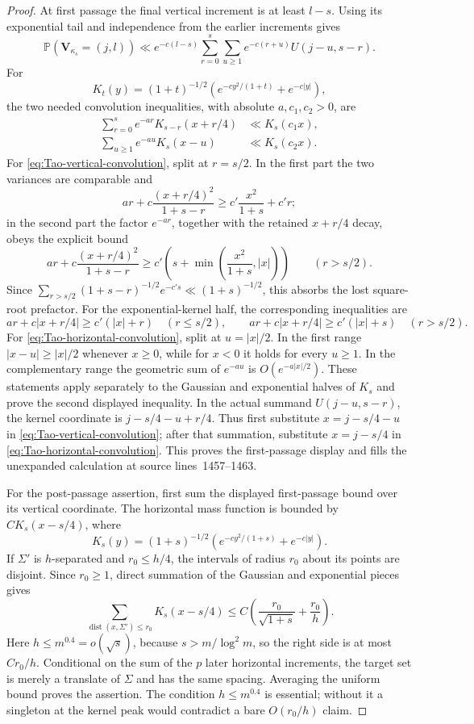 \begin{proof}
At first passage the final vertical increment is at least \(l-s\).  Using
its exponential tail and independence from the earlier increments gives
\[
 \mathbb P(\mathbf V_{\kappa_s}=(j,l))
 \ll e^{-c(l-s)}\sum_{r=0}^s\sum_{u\ge1}
 e^{-c(r+u)}U(j-u,s-r).
\]
For
\[
 K_t(y)=(1+t)^{-1/2}
 \left(e^{-c y^2/(1+t)}+e^{-c|y|}\right),
\]
the two needed convolution inequalities, with absolute
\(a,c_1,c_2>0\), are
\begin{align}
 \sum_{r=0}^{s}e^{-ar}K_{s-r}(x+r/4)
 &\ll K_s(c_1x),\label{eq:Tao-vertical-convolution}\\
 \sum_{u\ge1}e^{-au}K_s(x-u)
 &\ll K_s(c_2x).\label{eq:Tao-horizontal-convolution}
\end{align}
For \eqref{eq:Tao-vertical-convolution}, split at \(r=s/2\).  In the first
part the two variances are comparable and
\[
 ar+c\frac{(x+r/4)^2}{1+s-r}
 \ge c'\frac{x^2}{1+s}+c'r;
\]
in the second part the factor \(e^{-ar}\), together with the retained
\(x+r/4\) decay, obeys the explicit bound
\[
 ar+c\frac{(x+r/4)^2}{1+s-r}
 \ge c'\left(s+\min\left(\frac{x^2}{1+s},|x|\right)\right)
 \qquad(r>s/2).
\]
Since
\(\sum_{r>s/2}(1+s-r)^{-1/2}e^{-c's}\ll
(1+s)^{-1/2}\), this absorbs the lost square-root prefactor.  For the
exponential-kernel half, the corresponding inequalities are
\[
 ar+c|x+r/4|\ge c'(|x|+r)\quad(r\le s/2),
 \qquad
 ar+c|x+r/4|\ge c'(|x|+s)\quad(r>s/2).
\]
For \eqref{eq:Tao-horizontal-convolution}, split at \(u=|x|/2\).  In the
first range \(|x-u|\ge|x|/2\) whenever \(x\ge0\), while for \(x<0\) it
holds for every \(u\ge1\).  In the complementary range the geometric sum
of \(e^{-au}\) is \(O(e^{-a|x|/2})\).  These statements apply separately
to the Gaussian and exponential halves of \(K_s\) and prove the second
displayed inequality.  In the actual summand \(U(j-u,s-r)\), the kernel
coordinate is \(j-s/4-u+r/4\).  Thus first substitute
\(x=j-s/4-u\) in \eqref{eq:Tao-vertical-convolution}; after that summation,
substitute \(x=j-s/4\) in
\eqref{eq:Tao-horizontal-convolution}.  This proves the first-passage display and
fills the unexpanded calculation at source lines~1457--1463.

For the post-passage assertion, first sum the displayed first-passage bound
over its vertical coordinate.  The horizontal mass function is bounded by
\(C K_s(x-s/4)\), where
\[
 K_s(y)=(1+s)^{-1/2}
 \left(e^{-c y^2/(1+s)}+e^{-c|y|}\right).
\]
If \(\Sigma'\) is \(h\)-separated and \(r_0\le h/4\), the intervals of
radius \(r_0\) about its points are disjoint.  Since \(r_0\ge1\), direct
summation of the Gaussian and exponential pieces gives
\[
 \sum_{\operatorname{dist}(x,\Sigma')\le r_0}K_s(x-s/4)
 \le C\left(\frac {r_0}{\sqrt{1+s}}+\frac {r_0}h\right).
\]
Here \(h\le m^{0.4}=o(\sqrt{s})\), because
\(s>m/\log^2m\), so the right side is at most \(Cr_0/h\).  Conditional on the
sum of the \(p\) later horizontal increments, the target set is merely a
translate of \(\Sigma\) and has the same spacing.  Averaging the uniform
bound proves the assertion.  The condition \(h\le m^{0.4}\) is essential;
without it a singleton at the kernel peak would contradict a bare
\(O(r_0/h)\) claim.
\end{proof}


